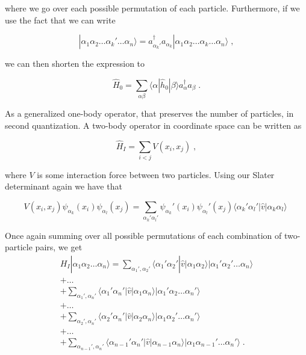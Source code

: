 where we go over each possible permutation of each particle. Furthermore, if we use the fact that we can write

\begin{equation}
    |\alpha_1\alpha_2 \dots \alpha_k' \dots \alpha_{n}\rangle = 
    	a_{\alpha_k'}^{\dagger}  a_{\alpha_k} |\alpha_1\alpha_2 \dots \alpha_k \dots \alpha_{n}\rangle \label{eq:2-29} \; ,
\end{equation}

we can then shorten the expression to

\begin{equation}
    \hat{H}_0 = \sum_{\alpha\beta} \langle \alpha|\hat{h}_0|\beta\rangle a_\alpha^{\dagger} a_\beta \label{eq:2-30b} \; .
\end{equation}

As a generalized one-body operator, that preserves the number of particles, in second quantization. A two-body operator in coordinate space can be written as

\begin{equation}
    \hat{H}_I = \sum_{i < j} V(x_i,x_j) \label{eq:2-31} \; ,
\end{equation}

where $V$ is some interaction force between two particles. Using our Slater determinant again we have that 

\begin{equation}
    V(x_i,x_j) \psi_{\alpha_k}(x_i) \psi_{\alpha_l}(x_j) = \sum_{\alpha_k'\alpha_l'} 
    	\psi_{\alpha_k}'(x_i)\psi_{\alpha_l}'(x_j) 
    	\langle \alpha_k'\alpha_l'|\hat{v}|\alpha_k\alpha_l\rangle \label{eq:2-32} \;
\end{equation}

Once again summing over all possible permutations of each combination of two-particle pairs, we get
\begin{equation}
\begin{gathered}
    H_I |\alpha_1\alpha_2\dots\alpha_n\rangle = \sum_{\alpha_1', \alpha_2'} \langle \alpha_1'\alpha_2'|\hat{v}|\alpha_1\alpha_2\rangle
    	|\alpha_1'\alpha_2'\dots\alpha_n\rangle  \\
     + \dots \\
     + \sum_{\alpha_1', \alpha_n'} \langle \alpha_1'\alpha_n'|\hat{v}|\alpha_1\alpha_n\rangle
    	|\alpha_1'\alpha_2\dots\alpha_n'\rangle  \\
     + \dots \\
     + \sum_{\alpha_2', \alpha_n'} \langle \alpha_2'\alpha_n'|\hat{v}|\alpha_2\alpha_n\rangle
    	|\alpha_1\alpha_2'\dots\alpha_n'\rangle \\ 
     + \dots \\
     + \sum_{\alpha_{n-1}', \alpha_n'} \langle \alpha_{n-1}'\alpha_n'|\hat{v}|\alpha_{n-1}\alpha_n\rangle
    	|\alpha_1\alpha_{n-1}'\dots\alpha_n'\rangle  \; .
\end{gathered}
\end{equation}

